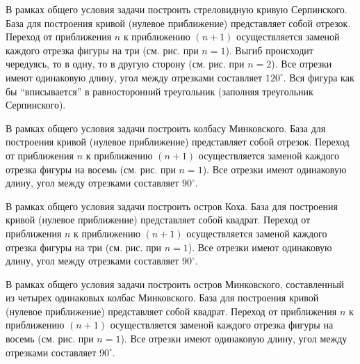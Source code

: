 
\begin{zztask}
В рамках общего условия задачи построить стреловидную кривую Серпинского.
База для построения кривой (нулевое приближение) представляет собой отрезок.
Переход от приближения $n$ к приближению $(n+1)$ осуществляется заменой каждого 
отрезка фигуры на три (см. рис. при $n=1$). 
Выгиб происходит чередуясь, то в одну, то в другую сторону (см. рис. при $n=2$).
Все отрезки 
имеют одинаковую длину, угол между отрезками составляет $120^\circ$. Вся фигура
как бы ``вписывается'' в равносторонний треугольник (заполняя треугольник 
Серпинского).
\par
\end{zztask}


\begin{zztask}
В рамках общего условия задачи построить колбасу Минковского.
База для построения кривой (нулевое приближение) представляет собой отрезок.
Переход от приближения $n$ к приближению $(n+1)$ осуществляется заменой каждого 
отрезка фигуры на восемь (см. рис. при $n=1$). 
Все отрезки имеют одинаковую длину, угол между отрезками составляет $90^\circ$.
\par
\end{zztask}


\begin{zztask}
В рамках общего условия задачи построить остров Коха. База для построения кривой 
(нулевое приближение) представляет собой квадрат.
Переход от приближения $n$ к приближению $(n+1)$ осуществляется заменой каждого 
отрезка фигуры на три (см. рис. при $n=1$). 
Все отрезки имеют одинаковую длину, угол между отрезками составляет $90^\circ$.
\par
\end{zztask}


\begin{zztask}
В рамках общего условия задачи построить остров Минковского, составленный из
четырех одинаковых колбас Минковского. База для построения кривой 
(нулевое приближение) представляет собой квадрат.
Переход от приближения $n$ к приближению $(n+1)$ осуществляется заменой каждого 
отрезка фигуры на восемь (см. рис. при $n=1$). 
Все отрезки имеют одинаковую длину, угол между отрезками составляет $90^\circ$.
\par
\end{zztask}

